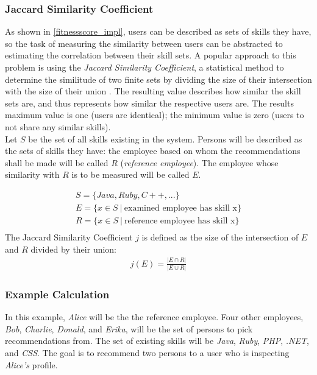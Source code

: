\subsubsection{Jaccard Similarity Coefficient}
As shown in \ref{fitnessscore_impl}, users can be described as sets of skills they have, so the task of measuring the similarity between users can be abstracted to estimating the correlation between their skill sets. A popular approach to this problem is using the \textit{Jaccard Similarity Coefficient}, a statistical method to determine the similitude of two finite sets by dividing the size of their intersection with the size of their union \cite{jaccard}. The resulting value describes how similar the skill sets are, and thus represents how similar the respective users are. The results maximum value is one (users are identical); the minimum value is zero (users to not share any similar skills).\\
Let $S$ be the set of all skills existing in the system. Persons will be described as the sets of skills they have: the employee based on whom the recommendations shall be made will be called $R$ (\textit{reference employee}). The employee whose similarity with $R$ is to be measured will be called $E$.

\begin{gather*}
	S = \{Java, Ruby, C++, ...\} \\
	E = \{x \in S \ | \ \textrm{examined employee has skill x}\} \\
	R = \{x \in S \ | \ \textrm{reference employee has skill x}\} \\
\end{gather*}
The Jaccard Similarity Coefficient $j$ is defined as the size of the intersection of $E$ and $R$ divided by their union:
\begin{gather*}
	j(E) = \frac{|E \cap R|}{|E \cup R|}
\end{gather*}

\subsubsection{Example Calculation}
In this example, \textit{Alice} will be the the reference employee. Four other employees, \textit{Bob}, \textit{Charlie}, \textit{Donald}, and \textit{Erika}, will be the set of persons to pick recommendations from. The set of existing skills will be \textit{Java}, \textit{Ruby}, \textit{PHP}, \textit{.NET}, and \textit{CSS}.
The goal is to recommend two persons to a user who is inspecting \textit{Alice's} profile.

